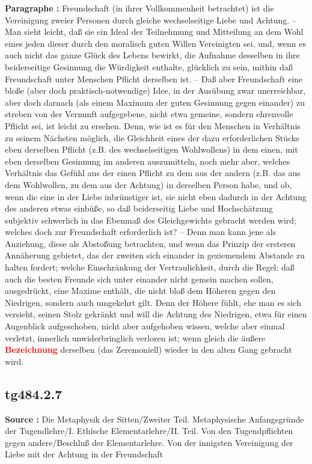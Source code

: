 \documentclass[a4paper,12pt,twoside]{book}
\newcommand{\match}[1]{\textcolor{red}{\textbf{#1}}}
\begin{document}
	\textbf{Paragraphe : }
	Freundschaft (in ihrer Vollkommenheit betrachtet) ist die Vereinigung zweier Personen durch gleiche wechselseitige Liebe und Achtung. – Man sieht leicht, daß sie ein Ideal der Teilnehmung und Mitteilung an dem Wohl eines jeden dieser durch den moralisch guten Willen Vereinigten sei, und, wenn es auch nicht das ganze Glück des Lebens bewirkt, die Aufnahme desselben in ihre beiderseitige Gesinnung die Würdigkeit enthalte, glücklich zu sein, mithin daß Freundschaft unter Menschen Pflicht derselben ist. – Daß aber Freundschaft eine bloße (aber doch praktisch-notwendige) Idee, in der Ausübung zwar unerreichbar, aber doch darnach (als einem Maximum der guten Gesinnung  gegen einander) zu streben von der Vernunft aufgegebene, nicht etwa gemeine, sondern ehrenvolle Pflicht sei, ist leicht zu ersehen. Denn, wie ist es für den Menschen in Verhältnis zu seinem Nächsten möglich, die Gleichheit eines der dazu erforderlichen Stücke eben derselben Pflicht (z.B. des wechselseitigen Wohlwollens) in dem einen, mit eben derselben Gesinnung im anderen auszumitteln, noch mehr aber, welches Verhältnis das Gefühl aus der einen Pflicht zu dem aus der andern (z.B. das aus dem Wohlwollen, zu dem aus der Achtung) in derselben Person habe, und ob, wenn die eine in der Liebe inbrünstiger ist, sie nicht eben dadurch in der Achtung des anderen etwas einbüße, so daß beiderseitig Liebe und Hochschätzung subjektiv schwerlich in das Ebenmaß des Gleichgewichts gebracht werden wird; welches doch zur Freundschaft erforderlich ist? – Denn man kann jene als Anziehung, diese als Abstoßung betrachten, und wenn das Prinzip der ersteren Annäherung gebietet, das der zweiten sich einander in geziemendem Abstande zu halten fordert; welche Einschränkung der Vertraulichkeit, durch die Regel: daß auch die besten Freunde sich unter einander nicht gemein machen sollen, ausgedrückt, eine Maxime enthält, die nicht bloß dem Höheren gegen den Niedrigen, sondern auch umgekehrt gilt. Denn der Höhere fühlt, ehe man es sich versieht, seinen Stolz gekränkt und will die Achtung des Niedrigen, etwa für einen Augenblick aufgeschoben, nicht aber aufgehoben wissen, welche aber einmal verletzt, innerlich unwiderbringlich verloren ist; wenn gleich die äußere \match{Bezeichnung} derselben (das Zeremoniell) wieder in den alten Gang gebracht wird. 
	
	\subsection*{tg484.2.7} 
	\textbf{Source : }Die Metaphysik der Sitten/Zweiter Teil. Metaphysische Anfangsgründe der Tugendlehre/I. Ethische Elementarlehre/II. Teil. Von den Tugendpflichten gegen andere/Beschluß der Elementarlehre. Von der innigsten Vereinigung der Liebe mit der Achtung in der Freundschaft\\  
	
\end{document}
